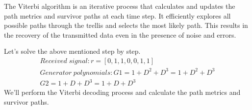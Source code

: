 \documentclass[10pt, onecolumn]{article}
\begin{document}
The Viterbi algorithm is an iterative process that calculates and updates the path metrics and survivor paths at each time step. It efficiently explores all possible paths through the trellis and selects the most likely path. This results in the recovery of the transmitted data even in the presence of noise and errors.

Let's solve the above mentioned step by step.
\begin{align}
Received\; signal : 
r = [0, 1, 1, 0, 0, 1, 1]\\
Generator\; polynomials :
G1 = 1 + D^2 + D^3 = 1 + D^2 + D^3\\
G2 = 1 + D + D^3 = 1 + D + D^3
\end{align}
We'll perform the Viterbi decoding process and calculate the path metrics and survivor paths.
\end{document}
